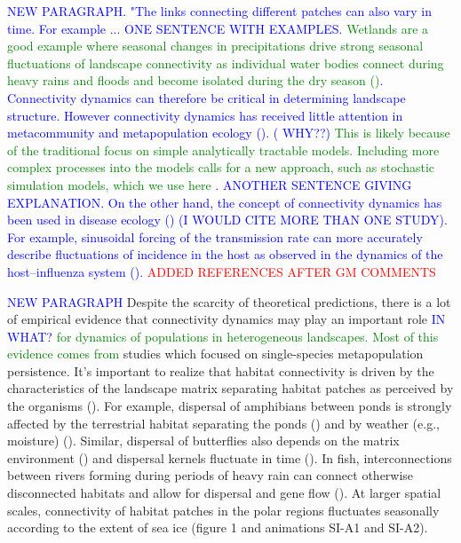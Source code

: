 \documentclass[12pt]{article}
\newcommand{\carlos}[1]{\textcolor{Red}{#1}}
\newcommand{\GM}[1]{\textcolor{Blue}{#1}}
\newcommand{\JK}[1]{\textcolor{Green}{#1}}
\begin{document}
\GM{NEW PARAGRAPH. "The links connecting different patches can also vary in time. For example ... ONE SENTENCE WITH EXAMPLES. \JK{Wetlands are a good example where seasonal changes in precipitations drive strong seasonal fluctuations of landscape connectivity as individual water bodies connect during heavy rains and floods and become isolated during the dry season (\cite{RoshierEtAl2008, RuizEtAl2014})}. Connectivity dynamics can therefore be critical in determining landscape structure. However connectivity dynamics has received little attention in metacommunity and metapopulation ecology (\cite{Holyoaketal2005,JohstEtAl2011}). ( WHY??) \JK{This is likely because of the traditional focus on simple analytically tractable models. Including more complex processes into the models calls for a new approach, such as stochastic simulation models, which we use here \citep{EvansEtAl2013}}. ANOTHER SENTENCE GIVING EXPLANATION. On the other hand, the concept of connectivity dynamics has been used in disease ecology (\cite{Keeling&Eames2005,Dushoffetal2004,Ross2010}) (I WOULD CITE MORE THAN ONE STUDY). For example, sinusoidal forcing of the transmission rate can more accurately describe fluctuations of incidence in the host as observed in the dynamics of the host–influenza system (\cite{Dushoffetal2004}).} \carlos{ADDED REFERENCES AFTER GM COMMENTS} 

\GM{NEW PARAGRAPH} Despite the scarcity of theoretical predictions, there is a lot of empirical evidence that connectivity dynamics may play an important role \GM{IN WHAT?} \JK{for dynamics of populations in heterogeneous landscapes.} \JK{Most of this evidence comes from} studies which focused on single-species metapopulation persistence. It's important to realize that habitat connectivity is driven by the characteristics of the landscape matrix separating habitat patches as perceived by the organisms (\cite{EycottEtAl2012}). For example, dispersal of amphibians between ponds is strongly affected by the terrestrial habitat separating the ponds (\cite{VanBuskirk2012, ClineHunter2014}) and by weather (e.g., moisture) (\cite{RittenhouseEtAl2009}). Similar, dispersal of butterflies also depends on the matrix environment (\cite{KueflerEtAl2010}) and dispersal kernels fluctuate in time (\cite{SchtickzelleEtAl2012}). In fish, interconnections between rivers forming during periods of heavy rain can connect otherwise disconnected habitats and allow for dispersal and gene flow (\cite{BoizardEtAl2009}). At larger spatial scales, connectivity of habitat patches in the polar regions fluctuates seasonally according to the extent of sea ice (figure 1 and animations SI-A1 and SI-A2). 
\end{document}
